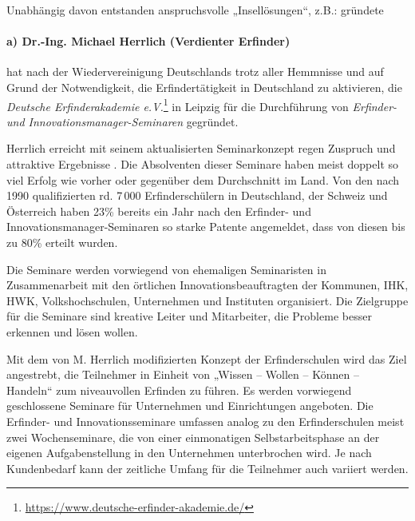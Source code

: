 \documentclass[11pt,a4paper]{article}
\begin{document}
Unabhängig davon entstanden anspruchsvolle „Insellösungen“, z.B.: gründete

\paragraph{a) Dr.-Ing. Michael Herrlich (Verdienter Erfinder)} 
hat nach der Wiedervereinigung Deutschlands trotz aller Hemmnisse und auf
Grund der Notwendigkeit, die Erfindertätigkeit in Deutschland zu aktivieren,
die \emph{Deutsche Erfinderakademie
e.V.}\footnote{\url{https://www.deutsche-erfinder-akademie.de/}} in Leipzig
für die Durch\-füh\-rung von \emph{Erfinder- und Innovationsmanager-Seminaren}
gegründet.

Herrlich erreicht mit seinem aktualisierten Seminarkonzept regen Zuspruch und
attraktive Ergebnisse \cite{17}. Die Absolventen dieser Seminare haben meist
doppelt so viel Erfolg wie vorher oder gegenüber dem Durchschnitt im Land. Von
den nach 1990 qualifizierten rd. 7\,000 Erfinderschülern in Deutschland, der
Schweiz und Österreich haben 23\% bereits ein Jahr nach den Erfinder- und
Innovationsmanager-Seminaren so starke Patente angemeldet, dass von diesen bis
zu 80\% erteilt wurden.

Die Seminare werden vorwiegend von ehemaligen Seminaristen in Zusammenarbeit
mit den örtlichen Innovationsbeauftragten der Kommunen, IHK, HWK,
Volkshochschulen, Unternehmen und Instituten organisiert. Die Zielgruppe für
die Seminare sind kreative Leiter und Mitarbeiter, die Probleme besser
erkennen und lösen wollen.

Mit dem von M. Herrlich modifizierten Konzept der Erfinderschulen wird das
Ziel angestrebt, die Teilnehmer in Einheit von „Wissen – Wollen – Können --
Handeln“ zum niveauvollen Erfinden zu führen. Es werden vorwiegend
geschlossene Seminare für Unternehmen und Einrichtungen angeboten. Die
Erfinder- und Innovationsseminare umfassen analog zu den Erfinderschulen meist
zwei Wochenseminare, die von einer einmonatigen Selbstarbeitsphase an der
eigenen Aufgabenstellung in den Unternehmen unterbrochen wird. Je nach
Kundenbedarf kann der zeitliche Umfang für die Teilnehmer auch variiert
werden.
\end{document}
